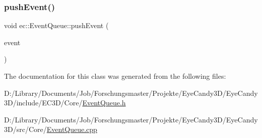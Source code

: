 \mbox{\label{classec_1_1_event_queue_aa69f9fd21873ad138b78de33fb867efb}} 
\subsubsection{\texorpdfstring{push\+Event()}{pushEvent()}}
{\footnotesize\ttfamily void ec\+::\+Event\+Queue\+::push\+Event (\begin{DoxyParamCaption}\item[{const \mbox{\hyperlink{structec_1_1_input_event}{Input\+Event}} \&}]{event }\end{DoxyParamCaption})}



The documentation for this class was generated from the following files\+:\begin{DoxyCompactItemize}
\item 
D\+:/\+Library/\+Documents/\+Job/\+Forschungsmaster/\+Projekte/\+Eye\+Candy3\+D/\+Eye\+Candy3\+D/include/\+E\+C3\+D/\+Core/\mbox{\hyperlink{_event_queue_8h}{Event\+Queue.\+h}}\item 
D\+:/\+Library/\+Documents/\+Job/\+Forschungsmaster/\+Projekte/\+Eye\+Candy3\+D/\+Eye\+Candy3\+D/src/\+Core/\mbox{\hyperlink{_event_queue_8cpp}{Event\+Queue.\+cpp}}\end{DoxyCompactItemize}

